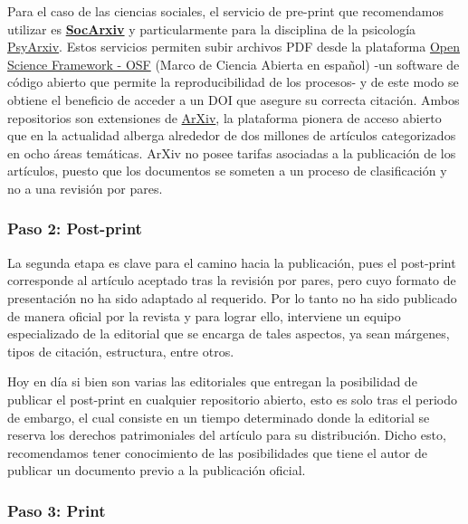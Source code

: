 \documentclass[
  spanish,
  a4paper,
  oneside]{scrbook}
\begin{document}
Para el caso de las ciencias sociales, el servicio de pre-print que
recomendamos utilizar es \href{https://socopen.org/}{\textbf{SocArxiv}}
y particularmente para la disciplina de la psicología
\href{https://psyarxiv.com/}{PsyArxiv}. Estos servicios permiten subir
archivos PDF desde la plataforma
\href{https://help.osf.io/hc/en-us/categories/360001530554-Preprints}{Open
Science Framework - OSF} (Marco de Ciencia Abierta en español) -un
software de código abierto que permite la reproducibilidad de los
procesos- y de este modo se obtiene el beneficio de acceder a un DOI que
asegure su correcta citación. Ambos repositorios son extensiones de
\href{https://arxiv.org/}{ArXiv}, la plataforma pionera de acceso
abierto que en la actualidad alberga alrededor de dos millones de
artículos categorizados en ocho áreas temáticas. ArXiv no posee tarifas
asociadas a la publicación de los artículos, puesto que los documentos
se someten a un proceso de clasificación y no a una revisión por pares.

\subsubsection*{Paso 2: Post-print}\label{paso-2-post-print}

La segunda etapa es clave para el camino hacia la publicación, pues el
post-print corresponde al artículo aceptado tras la revisión por pares,
pero cuyo formato de presentación no ha sido adaptado al requerido. Por
lo tanto no ha sido publicado de manera oficial por la revista y para
lograr ello, interviene un equipo especializado de la editorial que se
encarga de tales aspectos, ya sean márgenes, tipos de citación,
estructura, entre otros.

Hoy en día si bien son varias las editoriales que entregan la
posibilidad de publicar el post-print en cualquier repositorio abierto,
esto es solo tras el periodo de embargo, el cual consiste en un tiempo
determinado donde la editorial se reserva los derechos patrimoniales del
artículo para su distribución. Dicho esto, recomendamos tener
conocimiento de las posibilidades que tiene el autor de publicar un
documento previo a la publicación oficial.

\subsubsection*{Paso 3: Print}\label{paso-3-print}
\end{document}
